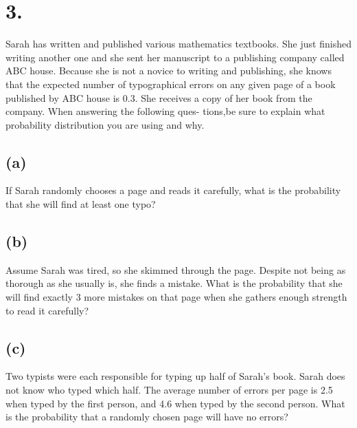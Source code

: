 \documentclass{article}
\begin{document}
\section*{3.}
{\Large 
Sarah has written and published various mathematics textbooks. She just finished writing another one and she
sent her manuscript to a publishing company called ABC house. Because she is not a novice to writing and
publishing, she knows that the expected number of typographical errors on any given page of a book published
by ABC house is 0.3. She receives a copy of her book from the company. When answering the following ques-
tions,be sure to explain what probability distribution you are using and why.

\subsection*{(a)}
If Sarah randomly chooses a page and reads it carefully, what is the probability that she will find
at least one typo?

\subsection*{(b)}
Assume Sarah was tired, so she skimmed through the page. Despite not being as thorough as
she usually is, she finds a mistake. What is the probability that she will find exactly 3 more mistakes on
that page when she gathers enough strength to read it carefully?

\subsection*{(c)}
Two typists were each responsible for typing up half of Sarah's book. Sarah does not know who
typed which half. The average number of errors per page is 2.5 when typed by the first person, and 4.6
when typed by the second person. What is the probability that a randomly chosen page will have no errors?

}
\end{document}

